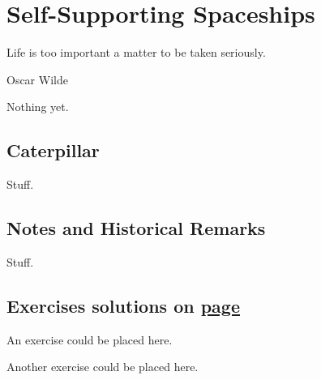 
\renewcommand{\chapterfolder}{self_support_spaceships/}
\chapter{Self-Supporting Spaceships}\label{chp:self_support_spaceships}


\vspace*{-0.4in}
\epigraph{Life is too important a matter to be taken seriously.}{Oscar Wilde}
\vspace*{0.4in}


\noindent Nothing yet.


\section{Caterpillar}\label{sec:caterpillar}

Stuff.


\section*{Notes and Historical Remarks}

Stuff.


\section*{Exercises \hfill \normalfont\textsf{\small solutions on \hyperlink{solutions_self_support_spaceships}{page \pageref{solutions_self_support_spaceships}}}}
\label{sec:solutions_self_support_spaceships}
\vspace*{-0.4cm}\hrulefill\vspace*{-0.3cm}\footnotesize\begin{multicols}{2}\vspace*{-0.4cm}\raggedcolumns{}
\setlength{\parskip}{0pt}


\begin{problem}\label{exer:self_support_spaceships_ex1}
	An exercise could be placed here.
\end{problem}


\mfilbreak


\begin{problem}\label{exer:self_support_spaceships_ex2}
	Another exercise could be placed here.
\end{problem}


\end{multicols}
\normalsize\vspace*{0.01cm}
